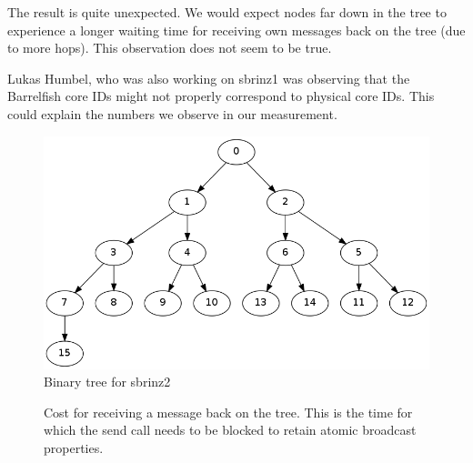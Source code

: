 \documentclass{article}
\begin{document}
The result is quite unexpected. We would expect nodes far down in the
tree to experience a longer waiting time for receiving own messages
back on the tree (due to more hops). This observation does not seem to
be true. 

Lukas Humbel, who was also working on sbrinz1 was observing that the
Barrelfish core IDs might not properly correspond to physical core
IDs. This could explain the numbers we observe in our measurement.

\begin{figure}[htb]
  \centering
  \includegraphics[width=\linewidth]{binary_tree_sbrinz2}
  \caption{Binary tree for sbrinz2}
  \label{fig:binary_tree_sbrinz2}
\end{figure}

\begin{figure}
  \caption{Cost for receiving a message back on the tree. This is the
    time for which the send call needs to be blocked to retain atomic
    broadcast properties.}
  \label{pgfplot:201305101058}
\end{figure}
\end{document}
